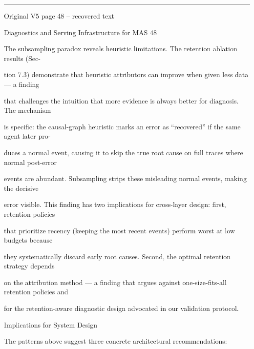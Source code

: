 \par\smallskip\noindent\rule{\textwidth}{0.4pt}\par{\sffamily\footnotesize Original V5 page 48 -- recovered text}\par\begin{flushleft}\footnotesize\ttfamily
\par\smallskip
\par\smallskip
\noindent Diagnostics and Serving Infrastructure for MAS 48\par
\par\smallskip
\par\smallskip
\par\smallskip
\noindent The subsampling paradox reveals heuristic limitations. The retention ablation results (Sec-\par
\noindent tion 7.3) demonstrate that heuristic attributors can improve when given less data — a finding\par
\noindent that challenges the intuition that more evidence is always better for diagnosis. The mechanism\par
\noindent is specific: the causal-graph heuristic marks an error as “recovered” if the same agent later pro-\par
\noindent duces a normal event, causing it to skip the true root cause on full traces where normal post-error\par
\noindent events are abundant. Subsampling strips these misleading normal events, making the decisive\par
\noindent error visible. This finding has two implications for cross-layer design: first, retention policies\par
\noindent that prioritize recency (keeping the most recent events) perform worst at low budgets because\par
\noindent they systematically discard early root causes. Second, the optimal retention strategy depends\par
\noindent on the attribution method — a finding that argues against one-size-fits-all retention policies and\par
\noindent for the retention-aware diagnostic design advocated in our validation protocol.\par
\par\smallskip
{} Implications for System Design\par
\noindent The patterns above suggest three concrete architectural recommendations:\par

\end{flushleft}
